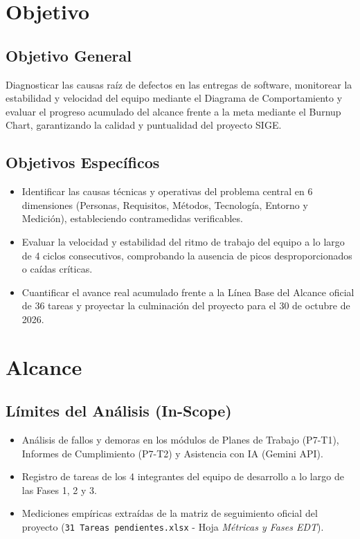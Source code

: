 \documentclass[12pt,a4paper]{article}
\begin{document}
\section{Objetivo}

\subsection{Objetivo General}
Diagnosticar las causas raíz de defectos en las entregas de software, monitorear la estabilidad y velocidad del equipo mediante el Diagrama de Comportamiento y evaluar el progreso acumulado del alcance frente a la meta mediante el Burnup Chart, garantizando la calidad y puntualidad del proyecto SIGE.

\subsection{Objetivos Específicos}
\begin{itemize}[leftmargin=1.5em, itemsep=1.5pt]
    \item Identificar las causas técnicas y operativas del problema central en 6 dimensiones (Personas, Requisitos, Métodos, Tecnología, Entorno y Medición), estableciendo contramedidas verificables.
    \item Evaluar la velocidad y estabilidad del ritmo de trabajo del equipo a lo largo de 4 ciclos consecutivos, comprobando la ausencia de picos desproporcionados o caídas críticas.
    \item Cuantificar el avance real acumulado frente a la Línea Base del Alcance oficial de 36 tareas y proyectar la culminación del proyecto para el 30 de octubre de 2026.
\end{itemize}

\section{Alcance}

\subsection{Límites del Análisis (In-Scope)}
\begin{itemize}[leftmargin=1.5em, itemsep=1.5pt]
    \item Análisis de fallos y demoras en los módulos de Planes de Trabajo (P7-T1), Informes de Cumplimiento (P7-T2) y Asistencia con IA (Gemini API).
    \item Registro de tareas de los 4 integrantes del equipo de desarrollo a lo largo de las Fases 1, 2 y 3.
    \item Mediciones empíricas extraídas de la matriz de seguimiento oficial del proyecto (\texttt{31 Tareas pendientes.xlsx} - Hoja \textit{Métricas y Fases EDT}).
\end{itemize}
\end{document}
